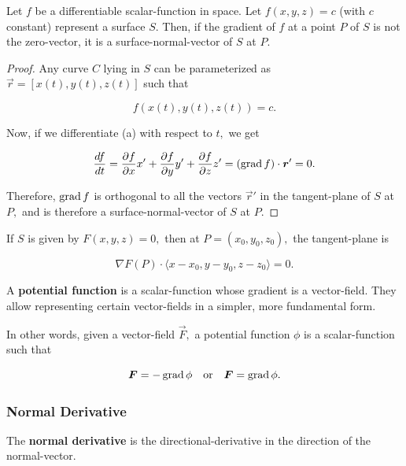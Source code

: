 \documentclass{article}
\begin{document}
\begin{theorem}\label{gradient-as-surface-normal-vector}
Let $f$ be a \@{differentiable} \@{scalar-function} in space. Let $f(x,y,z) = c$ (with $c$ constant) represent a surface $S.$ Then, if the \@{gradient} of $f$ at a \@{point} $P$ of $S$ is not the \@{zero-vector}, it is a \@{surface-normal-vector} of $S$ at $P.$
\end{theorem}

\begin{proof}
Any curve $C$ lying in $S$ can be parameterized as $\vec{r} = [x(t), y(t), z(t)]$ such that

\[ f(x(t), y(t), z(t)) = c. \tag{a} \]

Now, if we differentiate (a) with respect to $t,$ we get

\[ \frac{df}{dt} = \frac{\partial f}{\partial x} x' + \frac{\partial f}{\partial y} y' + \frac{\partial f}{\partial z} z' = (\operatorname{grad}{f}) \cdot \boldsymbol{r}' = 0. \]

Therefore, $\operatorname{grad}{f}$ is \@{orthogonal} to all the \@{vectors} $\vec{r}'$ in the \@{tangent-plane} of $S$ at $P,$ and is therefore a \@{surface-normal-vector} of $S$ at $P.$
\end{proof}

\begin{theorem}\label{find-tangent-plane}
If $S$ is given by $F(x,y,z) = 0,$ then at $P = (x_0, y_0, z_0),$ the \@{tangent-plane} is

\[ \nabla F(P) \cdot \langle x - x_0, y - y_0, z - z_0 \rangle = 0. \]
\end{theorem}

\begin{definition}
A \textbf{potential function} is a \@{scalar-function} whose \@{gradient} is a \@{vector-field}. They allow representing certain \@{vector-fields} in a simpler, more fundamental form.

In other words, given a \@{vector-field} $\vec{F},$ a potential function $\phi$ is a \@{scalar-function} such that

\[ \boldsymbol{F} = - \operatorname{grad}{\phi} \quad \text{or} \quad \boldsymbol{F} = \operatorname{grad}{\phi}. \]
\end{definition}

\subsubsection{Normal Derivative}

\begin{definition}
The \textbf{normal derivative} is the \@{directional-derivative} in the \@{direction} of the \@{normal-vector}.
\end{definition}
\end{document}
